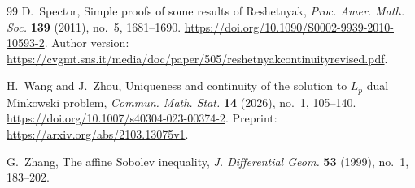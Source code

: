 \begin{thebibliography}{99}
D.~Spector, Simple proofs of some results of Reshetnyak,
\emph{Proc. Amer. Math. Soc.} \textbf{139} (2011), no.~5, 1681--1690.
\url{https://doi.org/10.1090/S0002-9939-2010-10593-2}.
Author version:
\url{https://cvgmt.sns.it/media/doc/paper/505/reshetnyakcontinuityrevised.pdf}.

H.~Wang and J.~Zhou, Uniqueness and continuity of the solution to
$L_p$ dual Minkowski problem,
\emph{Commun. Math. Stat.} \textbf{14} (2026), no.~1, 105--140.
\url{https://doi.org/10.1007/s40304-023-00374-2}.
Preprint: \url{https://arxiv.org/abs/2103.13075v1}.

G.~Zhang, The affine Sobolev inequality,
\emph{J. Differential Geom.} \textbf{53} (1999), no.~1, 183--202.

\end{thebibliography}
\endgroup

